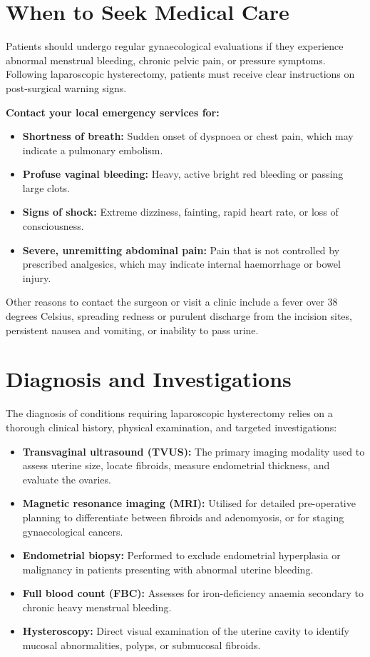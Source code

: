 \section*{When to Seek Medical Care}
Patients should undergo regular gynaecological evaluations if they experience abnormal menstrual bleeding, chronic pelvic pain, or pressure symptoms. Following laparoscopic hysterectomy, patients must receive clear instructions on post-surgical warning signs.

\textbf{Contact your local emergency services for:}
\begin{itemize}
    \item \textbf{Shortness of breath:} Sudden onset of dyspnoea or chest pain, which may indicate a pulmonary embolism.
    \item \textbf{Profuse vaginal bleeding:} Heavy, active bright red bleeding or passing large clots.
    \item \textbf{Signs of shock:} Extreme dizziness, fainting, rapid heart rate, or loss of consciousness.
    \item \textbf{Severe, unremitting abdominal pain:} Pain that is not controlled by prescribed analgesics, which may indicate internal haemorrhage or bowel injury.
\end{itemize}
Other reasons to contact the surgeon or visit a clinic include a fever over 38 degrees Celsius, spreading redness or purulent discharge from the incision sites, persistent nausea and vomiting, or inability to pass urine.

\section*{Diagnosis and Investigations}
The diagnosis of conditions requiring laparoscopic hysterectomy relies on a thorough clinical history, physical examination, and targeted investigations:
\begin{itemize}
    \item \textbf{Transvaginal ultrasound (TVUS):} The primary imaging modality used to assess uterine size, locate fibroids, measure endometrial thickness, and evaluate the ovaries.
    \item \textbf{Magnetic resonance imaging (MRI):} Utilised for detailed pre-operative planning to differentiate between fibroids and adenomyosis, or for staging gynaecological cancers.
    \item \textbf{Endometrial biopsy:} Performed to exclude endometrial hyperplasia or malignancy in patients presenting with abnormal uterine bleeding.
    \item \textbf{Full blood count (FBC):} Assesses for iron-deficiency anaemia secondary to chronic heavy menstrual bleeding.
    \item \textbf{Hysteroscopy:} Direct visual examination of the uterine cavity to identify mucosal abnormalities, polyps, or submucosal fibroids.
\end{itemize}

